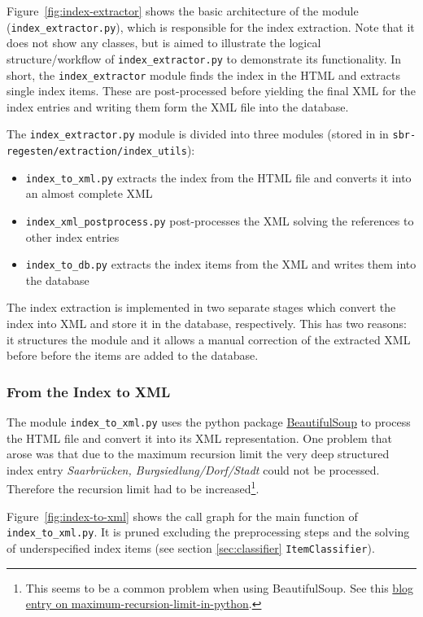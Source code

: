 Figure~\ref{fig:index-extractor} shows the basic architecture of the module (\texttt{index\_extractor.py}), which is responsible for the index extraction. Note that it does not show any classes, but is aimed to illustrate the logical structure/workflow of \texttt{index\_extractor.py} to demonstrate its functionality. In short, the \texttt{index\_extractor} module finds the index in the HTML and extracts single index items. These are post-processed before yielding the final XML for the index entries and writing them form the XML file into the database.

The \texttt{index\_extractor.py} module is divided into three modules (stored in in \texttt{sbr-regesten/\-extraction/\-index\_utils}):

\begin{itemize}
\item \texttt{index\_to\_xml.py} extracts the index from the HTML file and converts it into an almost complete XML
\item \texttt{index\_xml\_postprocess.py} post-processes the XML solving the references to other index entries
\item \texttt{index\_to\_db.py} extracts the index items from the XML and writes them into the database
\end{itemize}

The index extraction is implemented in two separate stages which convert the index into XML and store it in the database, respectively. This has two reasons: it structures the module and it allows a manual correction of the extracted XML before before the items are added to the database.

\subsubsection{From the Index to XML}
The module \texttt{index\_to\_xml.py} uses the python package \href{http://www.crummy.com/software/BeautifulSoup/bs4/doc/} {BeautifulSoup} to process the HTML file and convert it into its XML representation. One problem that arose was that due to the maximum recursion limit the very deep structured index entry \textit{Saarbrücken, Burgsiedlung/Dorf/Stadt} could not be processed. Therefore the recursion limit had to be increased\footnote{This seems to be a common problem when using BeautifulSoup. See this  \href{http://blog.pablohoffman.com/maximum-recursion-limit-in-python}{blog entry on maximum-recursion-limit-in-python}.}.

Figure~\ref{fig:index-to-xml} shows the call graph for the main function of \texttt{index\_to\_xml.py}. It is pruned excluding the preprocessing steps and the solving of underspecified index items (see section \ref{sec:classifier} \texttt{ItemClassifier}).

